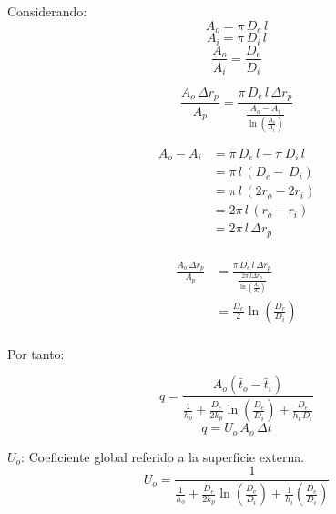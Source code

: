 Considerando:
\begin{equation*}
    A_o = \pi\,D_e\,l
\end{equation*}
\begin{equation*}
    A_i = \pi\,D_i\,l
\end{equation*}
\begin{equation*}
    \frac{A_o}{A_i} = \frac{D_e}{D_i}
\end{equation*}

\begin{equation*}
    \frac{A_o\,\Delta r_p}{A_p} = \frac{\pi\,D_e\,l\,\Delta r_p}{\frac{A_o-A_i}{\ln(\frac{A_o}{A_i})}}
\end{equation*}

\begin{equation*}
    \begin{split}
        A_o - A_i
            &= \pi\,D_e\,l - \pi\,D_i\,l\\
            &= \pi\,l\,(D_e - \,D_i)\\
            &= \pi\,l\,(2r_o - 2r_i)\\
            &= 2\pi\,l\,(r_o - r_i)\\
            &= 2\pi\,l\,\Delta r_p\\
    \end{split}
\end{equation*}

\begin{equation*}
    \begin{split}
        \frac{A_o\,\Delta r_p}{A_p}
            &= \frac{\pi\,D_e\,l\,\Delta r_p}{\frac{2\pi\,l\Delta r_p}{\ln(\frac{A_o}{A_i})}}\\
            &= \frac{D_e}{2}\ln\left(\frac{D_e}{D_i}\right)\\
    \end{split}
\end{equation*}

Por tanto:

\begin{equation*}
    q = \dfrac{A_o(\bar{t}_o - \bar{t}_i)}{\frac{1}{h_o} + \frac{D_e}{2k_p}\ln\left(\frac{D_e}{D_i}\right) + \frac{D_e}{h_i\,D_i}}
\end{equation*}
\begin{equation*}
    q = U_o\,A_o\,\Delta t
\end{equation*}

$U_o$: Coeficiente global referido a la superficie externa.
\begin{equation}
    U_o = \dfrac{1}{\frac{1}{h_o} + \frac{D_e}{2k_p}\ln\left(\frac{D_e}{D_i}\right) + \frac{1}{h_i}\left(\frac{D_e}{D_i}\right)}
\end{equation}

